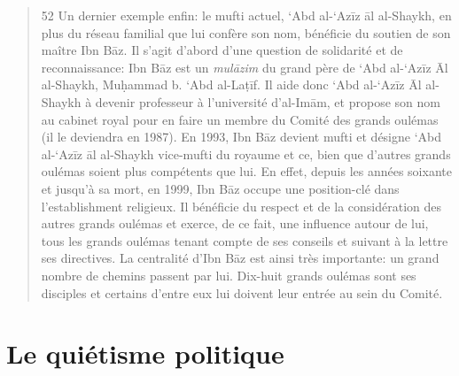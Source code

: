 \begin{quote}
52 Un dernier exemple enfin: le mufti actuel, `Abd al-`Azīz āl
al-Shaykh, en plus du réseau familial que lui confère son nom, bénéficie
du soutien de son maître Ibn Bāz. Il s'agit d'abord d'une question de
solidarité et de reconnaissance: Ibn Bāz est un \emph{mulāzim} du grand
père de `Abd al-`Azīz Āl al-Shaykh, Muḥammad b. `Abd al-Laṭīf. Il aide
donc `Abd al-`Azīz Āl al-Shaykh à devenir professeur à l'université
d'al-Imām, et propose son nom au cabinet royal pour en faire un membre
du Comité des grands oulémas (il le deviendra en 1987). En 1993, Ibn Bāz
devient mufti et désigne `Abd al-`Azīz āl al-Shaykh vice-mufti du
royaume et ce, bien que d'autres grands oulémas soient plus compétents
que lui. En effet, depuis les années soixante et jusqu'à sa mort, en
1999, Ibn Bāz occupe une position-clé dans l'establishment religieux. Il
bénéficie du respect et de la considération des autres grands oulémas et
exerce, de ce fait, une influence autour de lui, tous les grands oulémas
tenant compte de ses conseils et suivant à la lettre ses directives. La
centralité d'Ibn Bāz est ainsi très importante: un grand nombre de
chemins passent par lui. Dix-huit grands oulémas sont ses disciples et
certains d'entre eux lui doivent leur entrée au sein du Comité.
\end{quote}

\hypertarget{le-quiuxe9tisme-politique}{%
\section{Le quiétisme politique}\label{le-quiuxe9tisme-politique}}


